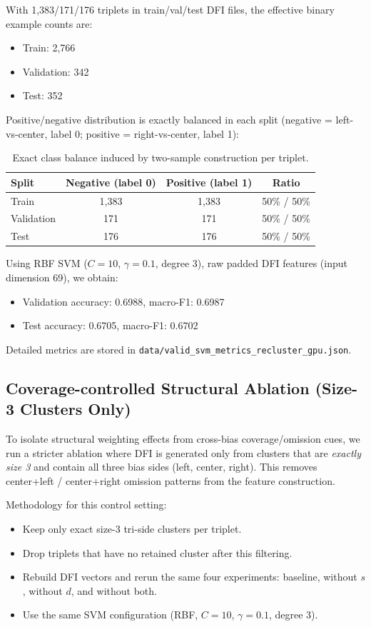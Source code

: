 \documentclass[12pt,a4paper]{article}
\begin{document}
With 1,383/171/176 triplets in train/val/test DFI files, the effective binary example counts are:
\begin{itemize}
\item Train: 2,766
\item Validation: 342
\item Test: 352
\end{itemize}

Positive/negative distribution is exactly balanced in each split
(negative = left-vs-center, label 0; positive = right-vs-center, label 1):
\begin{table}[h]
\centering
\begin{tabular}{lccc}
\hline
\textbf{Split} & \textbf{Negative (label 0)} & \textbf{Positive (label 1)} & \textbf{Ratio} \\
\hline
Train & 1,383 & 1,383 & 50\% / 50\% \\
Validation & 171 & 171 & 50\% / 50\% \\
Test & 176 & 176 & 50\% / 50\% \\
\hline
\end{tabular}
\caption{Exact class balance induced by two-sample construction per triplet.}
\label{tab:binary_class_balance}
\end{table}

Using RBF SVM (\(C=10\), \(\gamma=0.1\), degree 3), raw padded DFI features
(input dimension 69), we obtain:
\begin{itemize}
\item Validation accuracy: 0.6988, macro-F1: 0.6987
\item Test accuracy: 0.6705, macro-F1: 0.6702
\end{itemize}

Detailed metrics are stored in
\texttt{data/valid\_svm\_metrics\_recluster\_gpu.json}.

\subsection{Coverage-controlled Structural Ablation (Size-3 Clusters Only)}

To isolate structural weighting effects from cross-bias coverage/omission cues,
we run a stricter ablation where DFI is generated only from clusters that are
\textit{exactly size 3} and contain all three bias sides (left, center, right).
This removes center+left / center+right omission patterns from the feature construction.

Methodology for this control setting:
\begin{itemize}
\item Keep only exact size-3 tri-side clusters per triplet.
\item Drop triplets that have no retained cluster after this filtering.
\item Rebuild DFI vectors and rerun the same four experiments:
baseline, without $s$, without $d$, and without both.
\item Use the same SVM configuration (RBF, $C=10$, $\gamma=0.1$, degree 3).
\end{itemize}
\end{document}
